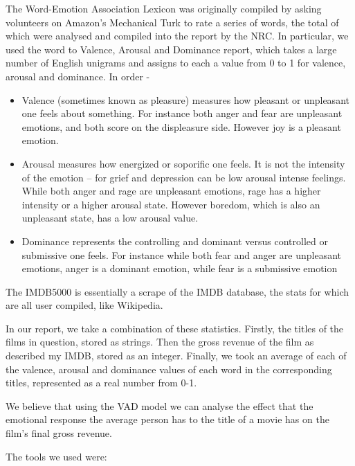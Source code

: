 \documentclass[12pt,a4paper]{article}
\begin{document}
    The Word-Emotion Association Lexicon was originally compiled by asking volunteers on Amazon's Mechanical Turk to rate a series of words, the total of which were analysed and compiled into the report by the NRC. In particular, we used the word to Valence, Arousal and Dominance report, which takes a large number of English unigrams and assigns to each a value from 0 to 1 for valence, arousal and dominance. In order -
    
    \begin{itemize}
        \item Valence (sometimes known as pleasure) measures how pleasant or unpleasant one feels about something. For instance both anger and fear are unpleasant emotions, and both score on the displeasure side. However joy is a pleasant emotion.
        \item Arousal measures how energized or soporific one feels. It is not the intensity of the emotion -- for grief and depression can be low arousal intense feelings. While both anger and rage are unpleasant emotions, rage has a higher intensity or a higher arousal state. However boredom, which is also an unpleasant state, has a low arousal value.
        \item Dominance represents the controlling and dominant versus controlled or submissive one feels. For instance while both fear and anger are unpleasant emotions, anger is a dominant emotion, while fear is a submissive emotion
    \end{itemize}
    
    The IMDB5000 is essentially a scrape of the IMDB database, the stats for which are all user compiled, like Wikipedia. 
    
    In our report, we take a combination of these statistics. Firstly, the titles of the films in question, stored as strings. Then the gross revenue of the film as described my IMDB, stored as an integer. Finally, we took an average of each of the valence, arousal and dominance values of each word in the corresponding titles, represented as a real number from 0-1. 
    
    We believe that using the VAD model we can analyse the effect that the emotional response the average person has to the title of a movie has on the film's final gross revenue.
    
    \newline \newline
    
    The tools we used were:
\end{document}
